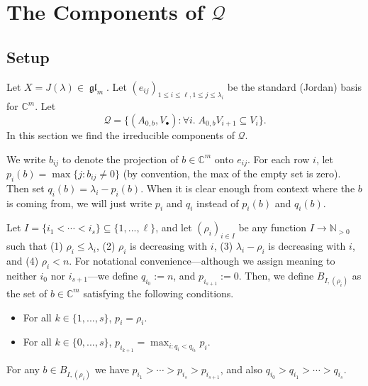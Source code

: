 \documentclass[12pt,psamsfonts]{article}
\DeclareMathOperator{\gl}{\mathfrak{gl}}
\begin{document}
\section{The Components of \texorpdfstring{\(\mathcal{Q}\)}{Q}}\label{q_comp}
\subsection{Setup}
Let \(X = J(\lambda) \in \gl_m\).
Let \((e_{ij})_{1 \leq i \leq \ell, 1 \leq j \leq \lambda_i}\) be the standard (Jordan) basis for \(\mathbb{C}^m\).
Let
\[\mathcal{Q} = \{(A_{0,b}, V_\bullet) : \forall i. \; A_{0,b} V_{i + 1} \subseteq V_i\}.\]
In this section we find the irreducible components of \(\mathcal{Q}\).
\par We write \(b_{ij}\) to denote the projection of \(b \in \mathbb{C}^m\) onto \(e_{ij}\).
For each row \(i\), let \(p_i(b) = \max\{j : b_{ij} \neq 0\}\) (by convention, the max of the empty set is zero).
Then set \(q_i(b) = \lambda_i - p_i(b)\).
When it is clear enough from context where the \(b\) is coming from, we will just write \(p_i\) and \(q_i\) instead of \(p_i(b)\) and \(q_i(b)\).
\par Let \(I = \{i_1 < \cdots < i_s\} \subseteq \{1, ..., \ell\}\), and let \((\rho_i)_{i \in I}\) be any function \(I \to \mathbb{N}_{> 0}\) such that (1) \(\rho_i \leq \lambda_i\), (2) \(\rho_i\) is decreasing with \(i\), (3) \(\lambda_i - \rho_i\) is decreasing with \(i\), and (4) \(\rho_i < n\).
For notational convenience---although we assign meaning to neither \(i_0\) nor \(i_{s + 1}\)---we define \(q_{i_0} := n\), and \(p_{i_{s + 1}} := 0\).
Then, we define \(B_{I, (\rho_i)}\) as the set of \(b \in \mathbb{C}^m\) satisfying the following conditions.
\begin{itemize}
    \item For all \(k \in \{1, ..., s\}\), \(p_i = \rho_i\).
    \item For all \(k \in \{0, ..., s\}\), \(p_{i_{k + 1}} = \max_{i : q_i < q_{i_k}} p_i\).
\end{itemize}
For any \(b \in B_{I, (\rho_i)}\) we have \(p_{i_1} > \cdots > p_{i_s} > p_{i_{s + 1}}\), and also \(q_{i_0} > q_{i_1} > \cdots > q_{i_s}\).
\end{document}

